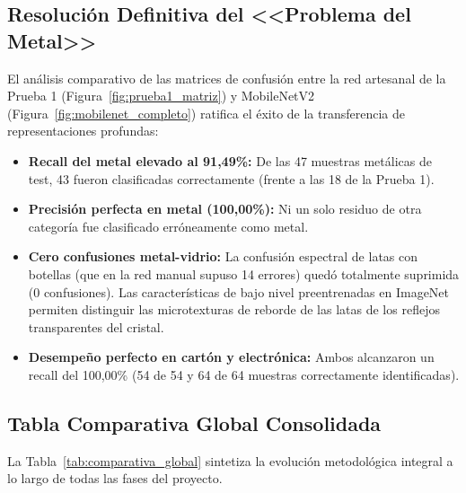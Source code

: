 \documentclass[11pt,a4paper]{article}
\begin{document}
\subsection{Resolución Definitiva del <<Problema del Metal>>}
El análisis comparativo de las matrices de confusión entre la red artesanal de la Prueba 1 (Figura~\ref{fig:prueba1_matriz}) y MobileNetV2 (Figura~\ref{fig:mobilenet_completo}) ratifica el éxito de la transferencia de representaciones profundas:
\begin{itemize}[noitemsep]
    \item \textbf{Recall del metal elevado al 91,49\%:} De las 47 muestras metálicas de test, 43 fueron clasificadas correctamente (frente a las 18 de la Prueba 1).
    \item \textbf{Precisión perfecta en metal (100,00\%):} Ni un solo residuo de otra categoría fue clasificado erróneamente como metal.
    \item \textbf{Cero confusiones metal-vidrio:} La confusión espectral de latas con botellas (que en la red manual supuso 14 errores) quedó totalmente suprimida (0 confusiones). Las características de bajo nivel preentrenadas en ImageNet permiten distinguir las microtexturas de reborde de las latas de los reflejos transparentes del cristal.
    \item \textbf{Desempeño perfecto en cartón y electrónica:} Ambos alcanzaron un recall del 100,00\% (54 de 54 y 64 de 64 muestras correctamente identificadas).
\end{itemize}

\subsection{Tabla Comparativa Global Consolidada}
La Tabla~\ref{tab:comparativa_global} sintetiza la evolución metodológica integral a lo largo de todas las fases del proyecto.
\end{document}
